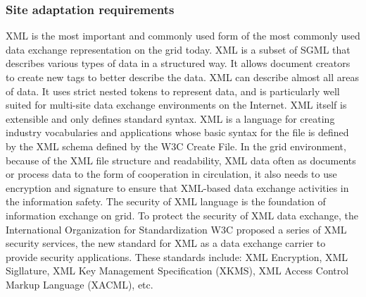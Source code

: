 \subsubsection{Site adaptation requirements}

XML is the most important and commonly used form of the most commonly used data exchange representation on the grid today.
XML is a subset of SGML that describes various types of data in a structured way.
It allows document creators to create new tags to better describe the data.
XML can describe almost all areas of data.
It uses strict nested tokens to represent data, and is particularly well suited for multi-site data exchange environments on the Internet.
XML itself is extensible and only defines standard syntax.
XML is a language for creating industry vocabularies and applications whose basic syntax for the file is defined by the XML schema defined by the W3C Create File.
In the grid environment, because of the XML file structure and readability, XML data often as documents or process data to the form of cooperation in circulation, it also needs to use encryption and signature to ensure that XML-based data exchange activities in the information safety.
The security of XML language is the foundation of information exchange on grid.
To protect the security of XML data exchange, the International Organization for Standardization W3C proposed a series of XML security services, the new standard for XML as a data exchange carrier to provide security applications.
These standards include: XML Encryption, XML Sigllature, XML Key Management Specification (XKMS), XML Access Control Markup Language (XACML), etc.

